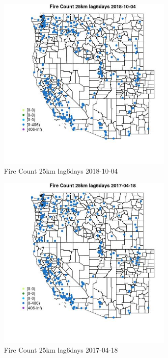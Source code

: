 \begin{figure} 
\centering  
\includegraphics[width=0.77\textwidth]{Code_Outputs/Report_ML_input_PM25_Step4_part_f_de_duplicated_aves_prioritize_24hr_obswNAs_MapObsFire_Count_25km_lag6days2018-10-04.jpg} 
\caption{\label{fig:Report_ML_input_PM25_Step4_part_f_de_duplicated_aves_prioritize_24hr_obswNAsMapObsFire_Count_25km_lag6days2018-10-04}Fire Count 25km lag6days 2018-10-04} 
\end{figure} 
 

\begin{figure} 
\centering  
\includegraphics[width=0.77\textwidth]{Code_Outputs/Report_ML_input_PM25_Step4_part_f_de_duplicated_aves_prioritize_24hr_obswNAs_MapObsFire_Count_25km_lag6days2017-04-18.jpg} 
\caption{\label{fig:Report_ML_input_PM25_Step4_part_f_de_duplicated_aves_prioritize_24hr_obswNAsMapObsFire_Count_25km_lag6days2017-04-18}Fire Count 25km lag6days 2017-04-18} 
\end{figure} 
 

